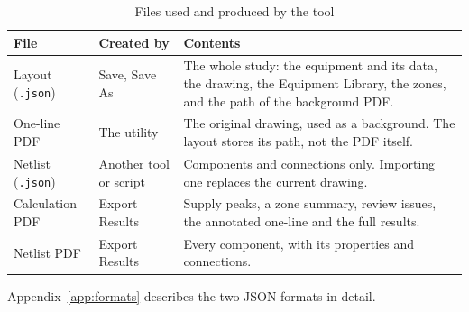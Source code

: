 \begin{table}[H]
  \centering
  \caption{Files used and produced by the tool}
  \label{tab:files}
  \begin{tabularx}{\textwidth}{l l L}
    \toprule
    \textbf{File} & \textbf{Created by} & \textbf{Contents} \\
    \midrule
    Layout (\texttt{.json}) & Save, Save As & The whole study: the equipment and its data, the drawing, the Equipment Library, the zones, and the path of the background PDF. \\
    One-line PDF & The utility & The original drawing, used as a background. The layout stores its path, not the PDF itself. \\
    Netlist (\texttt{.json}) & Another tool or script & Components and connections only. Importing one replaces the current drawing. \\
    Calculation PDF & Export Results & Supply peaks, a zone summary, review issues, the annotated one-line and the full results. \\
    Netlist PDF & Export Results & Every component, with its properties and connections. \\
    \bottomrule
  \end{tabularx}
\end{table}

Appendix~\ref{app:formats} describes the two JSON formats in detail.
